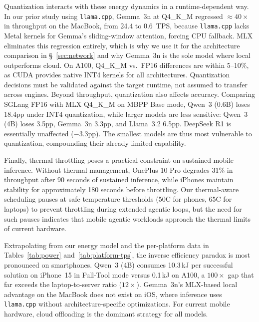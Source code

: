 \documentclass[sigconf,anonymous,review]{acmart}
\begin{document}
Quantization interacts with these energy dynamics in a runtime-dependent way. In our prior study using \texttt{llama.cpp}, Gemma~3n at Q4\_K\_M regressed ${\approx}40\times$ in throughput on the MacBook, from 24.4 to 0.6~TPS, because \texttt{llama.cpp} lacks Metal kernels for Gemma's sliding-window attention, forcing CPU fallback. MLX eliminates this regression entirely, which is why we use it for the architecture comparison in §~\ref{sec:network} and why Gemma~3n is the sole model where local outperforms cloud. On A100, Q4\_K\_M vs.\ FP16 differences are within 5--10\%, as CUDA provides native INT4 kernels for all architectures. Quantization decisions must be validated against the target runtime, not assumed to transfer across engines. Beyond throughput, quantization also affects accuracy. Comparing SGLang FP16 with MLX Q4\_K\_M on MBPP Base mode, Qwen~3 (0.6B) loses 18.4pp under INT4 quantization, while larger models are less sensitive: Qwen~3 (4B) loses 3.5pp, Gemma~3n 3.3pp, and Llama~3.2 6.5pp. DeepSeek R1 is essentially unaffected ($-$3.3pp). The smallest models are thus most vulnerable to quantization, compounding their already limited capability.

Finally, thermal throttling poses a practical constraint on sustained mobile inference. Without thermal management, OnePlus 10 Pro degrades 31\% in throughput after 90 seconds of sustained inference, while iPhones maintain stability for approximately 180 seconds before throttling. Our thermal-aware scheduling pauses at safe temperature thresholds (50\textdegree{}C for phones, 65\textdegree{}C for laptops) to prevent throttling during extended agentic loops, but the need for such pauses indicates that mobile agentic workloads approach the thermal limits of current hardware.

Extrapolating from our energy model and the per-platform data in Tables~\ref{tab:power} and~\ref{tab:platform-tps}, the inverse efficiency paradox is most pronounced on smartphones. Qwen~3 (4B) consumes 10.3\,kJ per successful solution on iPhone~15 in Full-Tool mode versus 0.1\,kJ on A100, a $100\times$ gap that far exceeds the laptop-to-server ratio ($12\times$). Gemma~3n's MLX-based local advantage on the MacBook does not exist on iOS, where inference uses \texttt{llama.cpp} without architecture-specific optimizations. For current mobile hardware, cloud offloading is the dominant strategy for all models.

\end{document}
